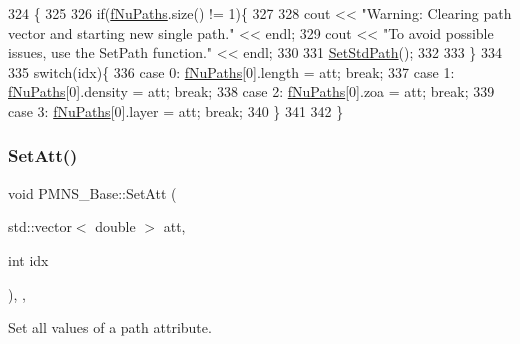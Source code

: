 \begin{DoxyCode}
324                                          \{
325 
326   \textcolor{keywordflow}{if}(\hyperlink{classOscProb_1_1PMNS__Base_a69db9d57e12fc7cbe0431bc6c18fac93}{fNuPaths}.size() != 1)\{
327 
328     cout << \textcolor{stringliteral}{"Warning: Clearing path vector and starting new single path."} << endl;
329     cout << \textcolor{stringliteral}{"To avoid possible issues, use the SetPath function."} << endl;
330 
331     \hyperlink{classOscProb_1_1PMNS__Base_add6533a9fc9acdfc7ae258b62570d78d}{SetStdPath}();
332 
333   \}
334 
335   \textcolor{keywordflow}{switch}(idx)\{
336     \textcolor{keywordflow}{case} 0: \hyperlink{classOscProb_1_1PMNS__Base_a69db9d57e12fc7cbe0431bc6c18fac93}{fNuPaths}[0].length  = att; \textcolor{keywordflow}{break};
337     \textcolor{keywordflow}{case} 1: \hyperlink{classOscProb_1_1PMNS__Base_a69db9d57e12fc7cbe0431bc6c18fac93}{fNuPaths}[0].density = att; \textcolor{keywordflow}{break};
338     \textcolor{keywordflow}{case} 2: \hyperlink{classOscProb_1_1PMNS__Base_a69db9d57e12fc7cbe0431bc6c18fac93}{fNuPaths}[0].zoa     = att; \textcolor{keywordflow}{break};
339     \textcolor{keywordflow}{case} 3: \hyperlink{classOscProb_1_1PMNS__Base_a69db9d57e12fc7cbe0431bc6c18fac93}{fNuPaths}[0].layer   = att; \textcolor{keywordflow}{break};
340   \}
341 
342 \}
\end{DoxyCode}
\mbox{\label{classOscProb_1_1PMNS__Base_aa001479b5f5828c3d16ed087f96ecbcc}} 
\subsubsection{\texorpdfstring{Set\+Att()}{SetAtt()}\hspace{0.1cm}{\footnotesize\ttfamily [2/2]}}
{\footnotesize\ttfamily void P\+M\+N\+S\+\_\+\+Base\+::\+Set\+Att (\begin{DoxyParamCaption}\item[{std\+::vector$<$ double $>$}]{att,  }\item[{int}]{idx }\end{DoxyParamCaption})\hspace{0.3cm}{\ttfamily [protected]}, {\ttfamily [virtual]}, {\ttfamily [inherited]}}

Set all values of a path attribute.

